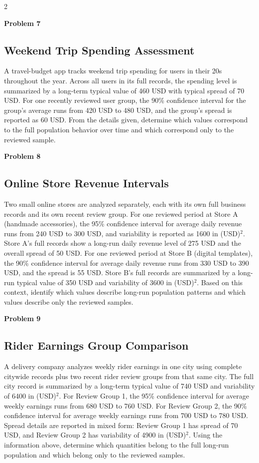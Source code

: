 \documentclass[12pt]{article}
\newcommand{\SubsectionBox}[1]{%
\noindent\colorbox{gray!30}{\parbox{\linewidth}{\textbf{#1}}}\par\vspace{0.35cm}%
}
\begin{document}
\begin{multicols}{2}
\vspace{0.5cm}
\SubsectionBox{Problem 7}
\subsection*{Weekend Trip Spending Assessment}
A travel-budget app tracks weekend trip spending for users in their 20s throughout the year.
		Across all users in its full records, the spending level is summarized by a long-term typical value of 460 USD with typical spread of 70 USD.
		For one recently reviewed user group, the 90\% confidence interval for the group's average runs from 420 USD to 480 USD, and the group's spread is reported as 60 USD.
		From the details given, determine which values correspond to the full population behavior over time and which correspond only to the reviewed sample.

\vspace{0.5cm}
\SubsectionBox{Problem 8}
\subsection*{Online Store Revenue Intervals}
Two small online stores are analyzed separately, each with its own full business records and its own recent review group.
		For one reviewed period at Store A (handmade accessories), the 95\% confidence interval for average daily revenue runs from 240 USD to 300 USD, and variability is reported as 1600 in (USD)$^2$.
		Store A's full records show a long-run daily revenue level of 275 USD and the overall spread of 50 USD.
		For one reviewed period at Store B (digital templates), the 90\% confidence interval for average daily revenue runs from 330 USD to 390 USD, and the spread is 55 USD.
		Store B's full records are summarized by a long-run typical value of 350 USD and variability of 3600 in (USD)$^2$.
		Based on this context, identify which values describe long-run population patterns and which values describe only the reviewed samples.

\vspace{0.5cm}
\SubsectionBox{Problem 9}
\subsection*{Rider Earnings Group Comparison}
A delivery company analyzes weekly rider earnings in one city using complete citywide records plus two recent rider review groups from that same city.
		The full city record is summarized by a long-term typical value of 740 USD and variability of 6400 in (USD)$^2$.
		For Review Group 1, the 95\% confidence interval for average weekly earnings runs from 680 USD to 760 USD.
		For Review Group 2, the 90\% confidence interval for average weekly earnings runs from 700 USD to 780 USD.
		Spread details are reported in mixed form: Review Group 1 has spread of 70 USD, and Review Group 2 has variability of 4900 in (USD)$^2$.
		Using the information above, determine which quantities belong to the full long-run population and which belong only to the reviewed samples.


\end{multicols}
\end{document}
